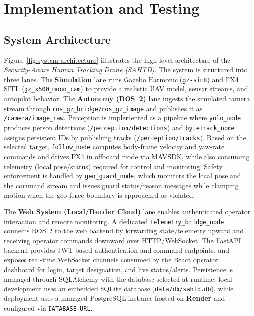 \documentclass[12pt,a4paper]{report}
\begin{document}
\chapter{Implementation and Testing}
\section{System Architecture}
\noindent
Figure~\ref{fig:system-architecture} illustrates the high-level architecture of the
\textit{Security-Aware Human Tracking Drone (SAHTD)}. The system is structured into three lanes.
The \textbf{Simulation} lane runs Gazebo Harmonic (\texttt{gz-sim8}) and \ac{PX4} \ac{SITL}
(\texttt{gz\_x500\_mono\_cam}) to provide a realistic UAV model, sensor streams, and autopilot behavior.
The \textbf{Autonomy (ROS~2)} lane ingests the simulated camera stream through
\texttt{ros\_gz\_bridge/ros\_gz\_image} and publishes it as \texttt{/camera/image\_raw}. Perception is implemented
as a pipeline where \texttt{yolo\_node} produces person detections (\texttt{/perception/detections}) and
\texttt{bytetrack\_node} assigns persistent IDs by publishing tracks (\texttt{/perception/tracks}).
Based on the selected target, \texttt{follow\_node} computes body-frame velocity and yaw-rate commands and drives
\ac{PX4} in offboard mode via \ac{MAVSDK}, while also consuming telemetry (local pose/status) required for control
and monitoring. Safety enforcement is handled by \texttt{geo\_guard\_node}, which monitors the local pose and the
command stream and issues guard status/reason messages while clamping motion when the geo-fence boundary is approached
or violated.

The \textbf{Web System (Local/Render Cloud)} lane enables authenticated operator interaction and remote monitoring.
A dedicated \texttt{telemetry\_bridge\_node} connects ROS~2 to the web backend by forwarding state/telemetry upward
and receiving operator commands downward over HTTP/WebSocket. The FastAPI backend provides JWT-based authentication
and command endpoints, and exposes real-time WebSocket channels consumed by the React operator dashboard for login,
target designation, and live status/alerts. Persistence is managed through SQLAlchemy with the database selected at
runtime: local development uses an embedded SQLite database (\texttt{data/db/sahtd.db}), while deployment uses a
managed PostgreSQL instance hosted on \textbf{Render} and configured via \texttt{DATABASE\_URL}.
\end{document}
